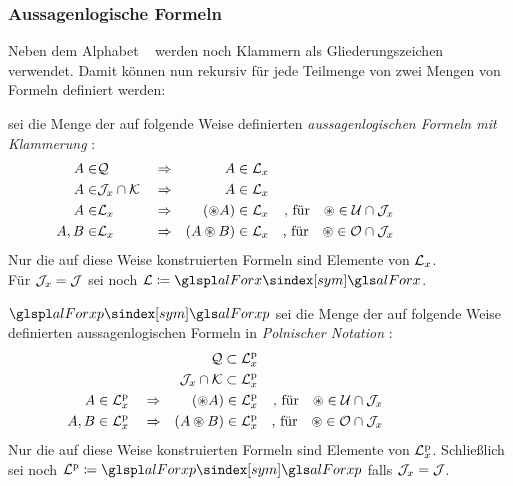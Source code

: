 \subsubsection{Aussagenlogische Formeln}%
\label{subsub:Formeln}

Neben dem Alphabet \objqt{\alABC} \textbzw\  werden noch Klammern als Gliederungszeichen verwendet.
Damit können nun rekursiv für jede Teilmenge  von \objqt{\alJun} zwei Mengen von Formeln definiert werden:

 sei die Menge der auf folgende Weise definierten \emph{aussagenlogischen Formeln mit Klammerung}%
:
\begin{align}
	A    \in & \mathcal{Q}               && \Rightarrow &           A  \in \mathcal{L}_x
	\\
	A    \in & \mathcal{J}_x \cap \mathcal{K}  && \Rightarrow &           A  \in \mathcal{L}_x
	\\
	A    \in & \mathcal{L}_x              && \Rightarrow &   (\circledast A) \in \mathcal{L}_x
	& & \text{, für} \quad \circledast \in \mathcal{U} \cap \mathcal{J}_x
	\\
	A, B \in & \mathcal{L}_x              && \Rightarrow & (A \circledast B) \in \mathcal{L}_x
	& & \text{, für} \quad \circledast \in \mathcal{O} \cap \mathcal{J}_x
	&&&&&&&&&&
\end{align}
Nur die auf diese Weise konstruierten Formeln sind Elemente von $\mathcal{L}_x$.
\\Für $\mathcal{J}_x = \mathcal{J}$ sei noch $\alFor \defeq \glsSym{alForx}$.

$\glsSym{alForxp}$ sei die Menge der auf folgende Weise definierten aussagenlogischen Formeln in \emph{Polnischer Notation}%
:
\begin{align}
	&                                  & \mathcal{Q}              \subset \mathcal{L}^\mathrm{p}_x
	\\
	&                                  & \mathcal{J}_x \cap \mathcal{K} \subset \mathcal{L}^\mathrm{p}_x
	\\
	A    \in \mathcal{L}^\mathrm{p}_x & \quad \Rightarrow &  (\circledast A)         \in     \mathcal{L}^\mathrm{p}_x
	& & \text{, für}  \quad \circledast \in \mathcal{U} \cap \mathcal{J}_x
	\\
	A, B \in \mathcal{L}^\mathrm{p}_x & \quad \Rightarrow & (A \circledast B)        \in     \mathcal{L}^\mathrm{p}_x
	& & \text{, für}  \quad \circledast \in \mathcal{O} \cap \mathcal{J}_x
	&&&&&&&&&&
\end{align}
Nur die auf diese Weise konstruierten Formeln sind Elemente von $\mathcal{L}^\mathrm{p}_x$.
Schließlich sei noch $\alForp \defeq \glsSym{alForxp}$ falls $\mathcal{J}_x = \mathcal{J}$.

